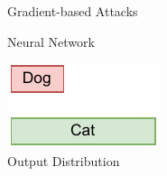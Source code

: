 \begin{frame}{Gradient-based Attacks}
\begin{minipage}{0.4\linewidth}
        Neural Network
    \end{minipage}\hfill
    \begin{minipage}{0.2\linewidth}
        \centering
        \includegraphics[width=\linewidth]{assets/correct_y_prob.pdf}\\
        Output Distribution
    \end{minipage}    
\end{frame}




